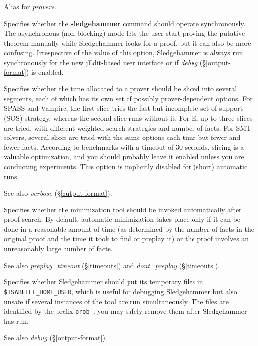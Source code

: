 \documentclass[a4paper,12pt]{article}
\begin{document}
\begin{enum}
Alias for \textit{provers}.

Specifies whether the \textbf{sledgehammer} command should operate
synchronously. The asynchronous (non-blocking) mode lets the user start proving
the putative theorem manually while Sledgehammer looks for a proof, but it can
also be more confusing. Irrespective of the value of this option, Sledgehammer
is always run synchronously for the new jEdit-based user interface or if
\textit{debug} (\S\ref{output-format}) is enabled.

Specifies whether the time allocated to a prover should be sliced into several
segments, each of which has its own set of possibly prover-dependent options.
For SPASS and Vampire, the first slice tries the fast but incomplete
set-of-support (SOS) strategy, whereas the second slice runs without it. For E,
up to three slices are tried, with different weighted search strategies and
number of facts. For SMT solvers, several slices are tried with the same options
each time but fewer and fewer facts. According to benchmarks with a timeout of
30 seconds, slicing is a valuable optimization, and you should probably leave it
enabled unless you are conducting experiments. This option is implicitly
disabled for (short) automatic runs.

\nopagebreak
{\small See also \textit{verbose} (\S\ref{output-format}).}

Specifies whether the minimization tool should be invoked automatically after
proof search. By default, automatic minimization takes place only if
it can be done in a reasonable amount of time (as determined by
the number of facts in the original proof and the time it took to find or
preplay it) or the proof involves an unreasonably large number of facts.

\nopagebreak
{\small See also \textit{preplay\_timeout} (\S\ref{timeouts})
and \textit{dont\_preplay} (\S\ref{timeouts}).}

Specifies whether Sledgehammer should put its temporary files in
\texttt{\$ISA\-BELLE\_\allowbreak HOME\_\allowbreak USER}, which is useful for
debugging Sledgehammer but also unsafe if several instances of the tool are run
simultaneously. The files are identified by the prefix \texttt{prob\_}; you may
safely remove them after Sledgehammer has run.

\nopagebreak
{\small See also \textit{debug} (\S\ref{output-format}).}
\end{enum}
\end{document}
